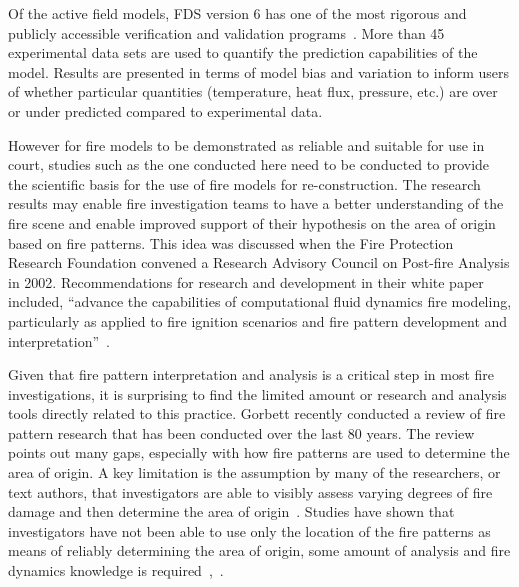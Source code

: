 \documentclass[twoside]{uocthesis}
\begin{document}
Of the active field models, FDS version 6 has one of the most rigorous and publicly accessible verification and validation programs~\cite{McGrattan:2014}. More than 45 experimental data sets are used to quantify the prediction capabilities of the model.  Results are presented in terms of model bias and variation to inform users of whether particular quantities (temperature, heat flux, pressure, etc.) are over or under predicted compared to experimental data.

However for fire models to be demonstrated as reliable and suitable for use in court, studies such as the one conducted here need to be conducted to provide the scientific basis for the use of fire models for re-construction.  The research results may enable fire investigation teams to have a better understanding of the fire scene and enable improved support of their hypothesis on the area of origin based on fire patterns.  This idea was discussed when the Fire Protection Research Foundation convened a Research Advisory Council on Post-fire Analysis in 2002.  Recommendations for research and development in their white paper included, ``advance the capabilities of computational fluid dynamics fire modeling, particularly as applied to fire ignition scenarios and fire pattern development and interpretation''~\cite{RAC:2002}.

Given that fire pattern interpretation and analysis is a critical step in most fire investigations, it is surprising to find the limited amount or research and analysis tools directly related to this practice.  Gorbett recently conducted a review of fire pattern research that has been conducted over the last 80 years. The review points out many gaps, especially with how fire patterns are used to determine the area of origin.  A key limitation is the assumption by many of the researchers, or text authors, that investigators are able to visibly assess varying degrees of fire damage and then determine the area of origin~\cite{Gorbett_2015}. Studies have shown that investigators have not been able to use only the location of the fire patterns as means of reliably determining the area of origin, some amount of analysis and fire dynamics knowledge is required~\cite{Carmen_2008},~\cite{Tinsley_2013}.      
\end{document}
